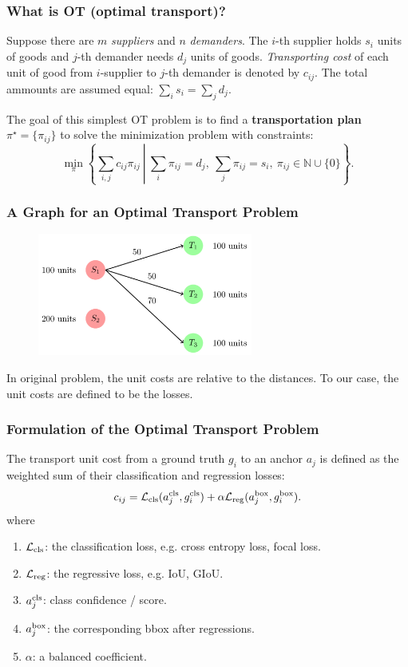 \documentclass[slidetop, mathserif, dvipsnames]{beamer}
\begin{document}
\begin{frame}
    \frametitle{What is OT (optimal transport)?}

    Suppose there are $m$ {\it suppliers} and $n$ {\it demanders}.
    The $i$-th supplier holds $s_i$ units of goods and $j$-th demander
    needs $d_j$ units of goods.
    {\it Transporting cost} of each unit of good from $i$-supplier
    to $j$-th demander is denoted by $c_{ij}$.
    The total ammounts are assumed equal: $\sum_{i}s_i = \sum_j d_j$.

    \quad
    
    The goal of this simplest OT problem is to find a {\bf transportation plan}
    $\pi^\star = \{\pi_{ij}\}$ to solve the minimization problem with constraints:
    \[
        \min_\pi\left\{\sum_{i,j} c_{ij}\pi_{ij}\ \left|\ \sum_i \pi_{ij} = d_j,~ \sum_j \pi_{ij}=s_i,
        ~ \pi_{ij}\in\mathbb N\cup\{0\}\right.\right\}.
    \]
    
\end{frame}

\begin{frame}
    \frametitle{A Graph for an Optimal Transport Problem}

    \begin{figure}
    \includegraphics[width=200pt]{pics/ota_graph.png}
    \end{figure}

    In original problem, the unit costs are relative to the distances.
    To our case, the unit costs are defined to be the losses.

\end{frame}

\begin{frame}
    \frametitle{Formulation of the Optimal Transport Problem}

    The transport unit cost from a ground truth $g_i$ to an anchor $a_j$
    is defined as the weighted sum of their classification and regression losses:
    \[
        c_{ij} = \mathcal L_{\rm cls}(a_j^{\rm cls}, g_i^{\rm cls})
        + \alpha \mathcal L_{\rm reg}(a_j^{\rm box}, g_i^{\rm box}).
    \]
    where
    \begin{enumerate}
    \item $\mathcal L_{\rm cls}$: the classification loss, e.g. cross entropy loss, focal loss.
    \item $\mathcal L_{\rm reg}$: the regressive loss, e.g. IoU, GIoU.
    \item $a_j^{\rm cls}$: class confidence / score.
    \item $a_j^{\rm box}$: the corresponding bbox after regressions.
    \item $\alpha$: a balanced coefficient.
    \end{enumerate}
\end{frame}
\end{document}
